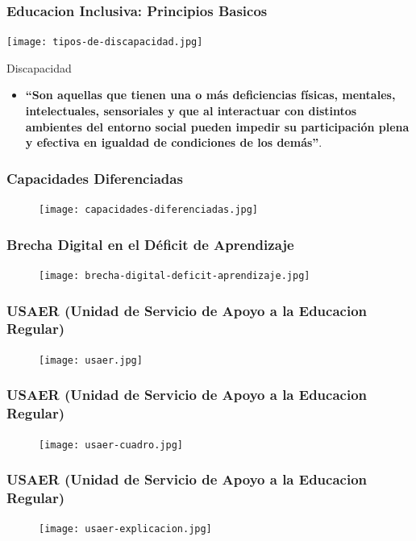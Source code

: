 \documentclass[11pt]{beamer}
\begin{document}
\begin{frame}
\frametitle{Educacion Inclusiva: Principios Basicos}
    \justify
    \begin{minipage}[c]{0.4\textwidth} 
    \texttt{[image: tipos-de-discapacidad.jpg]} 
    \end{minipage}
    \begin{minipage}[c]{0.55\textwidth}
    Discapacidad
        \begin{itemize}
      
        \item {\bf“Son aquellas que tienen una o más deficiencias físicas, mentales, intelectuales, sensoriales y que al interactuar con distintos ambientes del entorno social pueden impedir su participación plena y efectiva en igualdad de condiciones de los demás”}.
        \end{itemize}
    \end{minipage}
\end{frame}

\begin{frame}
\frametitle{Capacidades Diferenciadas}
    \begin{figure}
    \centering
     \texttt{[image: capacidades-diferenciadas.jpg]} 
    \end{figure}
\end{frame}

\begin{frame}
\frametitle{Brecha Digital en el Déficit de Aprendizaje}
    \begin{figure}
    \centering
     \texttt{[image: brecha-digital-deficit-aprendizaje.jpg]} 
    \end{figure}
\end{frame}

\begin{frame}
\frametitle{USAER (Unidad de Servicio de Apoyo a la Educacion Regular)}
    \begin{figure}
    \centering
     \texttt{[image: usaer.jpg]} 
    \end{figure}
\end{frame}

\begin{frame}
\frametitle{USAER (Unidad de Servicio de Apoyo a la Educacion Regular)}
    \begin{figure}
    \centering
     \texttt{[image: usaer-cuadro.jpg]} 
    \end{figure}
\end{frame}


\begin{frame}
\frametitle{USAER (Unidad de Servicio de Apoyo a la Educacion Regular)}
    \begin{figure}
    \centering
     \texttt{[image: usaer-explicacion.jpg]} 
    \end{figure}
\end{frame}
\end{document}
